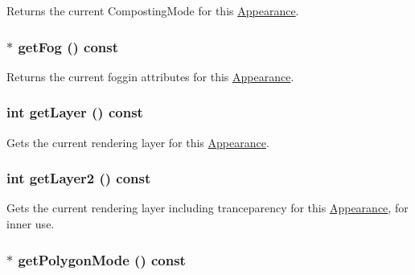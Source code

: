 Returns the current CompostingMode for this \hyperlink{classm3g_1_1Appearance}{Appearance}. \hypertarget{classm3g_1_1Appearance_93143a921b998ff69576147a59eb44d4}{
\subsubsection[{getFog}]{ $\ast$ getFog () const}}
\label{classm3g_1_1Appearance_93143a921b998ff69576147a59eb44d4}


Returns the current foggin attributes for this \hyperlink{classm3g_1_1Appearance}{Appearance}. \hypertarget{classm3g_1_1Appearance_df831e0e0ebf9d7e997150e497e6a6cf}{
\subsubsection[{getLayer}]{\setlength{\rightskip}{0pt plus 5cm}int getLayer () const}}
\label{classm3g_1_1Appearance_df831e0e0ebf9d7e997150e497e6a6cf}


Gets the current rendering layer for this \hyperlink{classm3g_1_1Appearance}{Appearance}. \hypertarget{classm3g_1_1Appearance_0843200b0a6a79f7753380e833a1af0c}{
\subsubsection[{getLayer2}]{\setlength{\rightskip}{0pt plus 5cm}int getLayer2 () const}}
\label{classm3g_1_1Appearance_0843200b0a6a79f7753380e833a1af0c}


Gets the current rendering layer including tranceparency for this \hyperlink{classm3g_1_1Appearance}{Appearance}, for inner use. \hypertarget{classm3g_1_1Appearance_dd3ddcefcd18339150d281b155602886}{
\subsubsection[{getPolygonMode}]{ $\ast$ getPolygonMode () const}}
\label{classm3g_1_1Appearance_dd3ddcefcd18339150d281b155602886}


